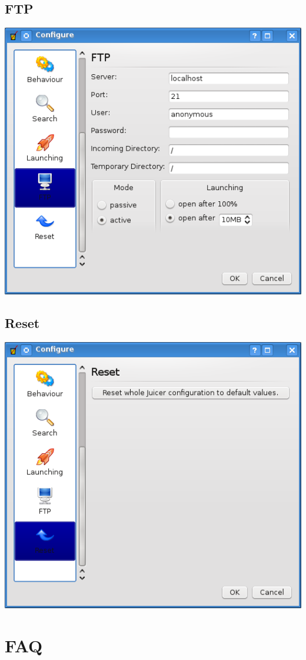 \documentclass[a4paper,10pt]{book}
\begin{document}
\section{FTP}
\label{sec:conf_ftp}
\includegraphics[width=1.0\textwidth]{./images/configure_ftp.png}

\section{Reset}
\label{sec:conf_reset}
\includegraphics[width=1.0\textwidth]{./images/configure_reset.png}


\chapter{FAQ}
\label{sec:faq}
\end{document}
